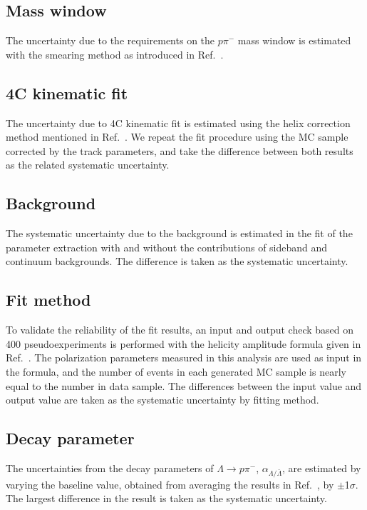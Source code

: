 \documentclass[a4paper,11pt]{article}
\begin{document}
\subsection{Mass window}
The uncertainty due to the requirements on the $p\pi^-$ mass window is estimated with the smearing method as introduced in Ref.~\cite{yanliang}.

\subsection{4C kinematic fit}
The uncertainty due to 4C kinematic fit is estimated using the helix correction method mentioned in Ref.~\cite{PRD_012002}. 
We repeat the fit procedure using the MC sample corrected by the track parameters, and take the difference between both results as the related systematic uncertainty.

\subsection{Background}
The systematic uncertainty due to the background is estimated in the fit of the parameter extraction with and without the contributions of sideband and continuum backgrounds. The difference is taken as the systematic uncertainty.  


\subsection{Fit method}
To validate the reliability of the fit results, an input and output check based on 400 pseudoexperiments is performed with the helicity amplitude formula {given} in Ref.~\cite{Faldt:2017kgy}. The polarization parameters measured in this analysis are used as input in the formula, and the number of events in each generated MC sample is nearly equal to the number in data sample. The differences between the input value and output value are taken as the systematic uncertainty by fitting method.

\subsection{Decay parameter}
The uncertainties from the decay parameters of $\Lambda\to p\pi^{-}$, $\alpha_{\Lambda/\bar\Lambda}$, are estimated by varying the baseline value, obtained from averaging the results in Ref.~\cite{BESIII:2022yprl}, by $\pm$1$\sigma$. The largest difference in the result is taken as the systematic uncertainty.
\end{document}
